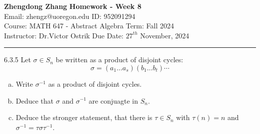 \documentclass[a4paper, 12pt]{article}
\begin{document}
\noindent
\large\textbf{Zhengdong Zhang} \hfill \textbf{Homework - Week 8}   \\
Email: zhengz@uoregon.edu \hfill ID: 952091294 \\
\normalsize Course: MATH 647 - Abstract Algebra  \hfill Term: Fall 2024\\
Instructor: Dr.Victor Ostrik \hfill Due Date: $27^{th}$ November, 2024 \\
\noindent\rule{7in}{2.8pt}
\begin{problem}{6.3.5}
Let \(\sigma\in S_n\) be written as a product of disjoint cycles:
\[\sigma=(a_1\ldots a_s)(b_1\ldots b_t)\cdots\]
\begin{enumerate}[(a)]
\item Write \(\sigma^{-1}\) as a product of disjoint cycles.
\item Deduce that \(\sigma\) and \(\sigma^{-1}\) are conjuagte in \(S_n\).
\item Deduce the stronger statement, that there is \(\tau\in S_n\) with \(\tau(n)=n\) and \(\sigma^{-1}=\tau\sigma\tau^{-1}\).
\end{enumerate}
\end{problem}
\end{document}
